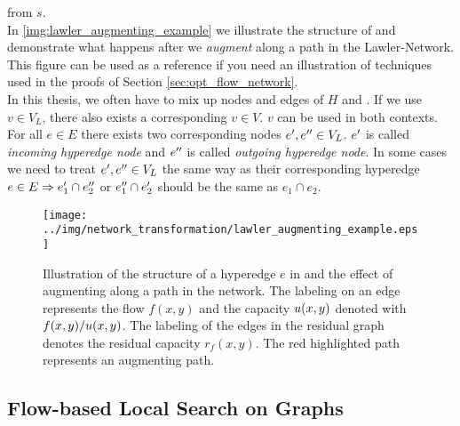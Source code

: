 from $s$. \\ 
In \autoref{img:lawler_augmenting_example} we illustrate the structure of  and demonstrate
what happens after we \emph{augment} along a path in the Lawler-Network. This figure can be used as
a reference if you need an illustration of techniques used in the proofs of Section \ref{sec:opt_flow_network}.\\
In this thesis, we often have to mix up nodes and edges of $H$ and . If we use
$v \in V_L$, there also exists a corresponding $v \in V$. $v$ can be used in both contexts.
For all $e \in E$ there exists two corresponding nodes $e',e'' \in V_L$. $e'$ 
is called \emph{incoming hyperedge node} and $e''$ is called \emph{outgoing hyperedge node}. 
In some cases we need to treat $e',e'' \in V_L$ the same way as their corresponding 
hyperedge $e \in E \Rightarrow e_1' \cap e_2''$ or $e_1'' \cap e_2'$ should be the same as $e_1 \cap e_2$.
\begin{figure}[t!]
\centering
\texttt{[image: ../img/network\_transformation/lawler\_augmenting\_example.eps]}
\caption{Illustration of the structure of a hyperedge $e$ in  and the effect of augmenting
         along a path in the network. The labeling on an edge represents the flow $f(x,y)$ and
         the capacity $u(x,y)$ denoted with $f(x,y)/u(x,y)$. The labeling of the
         edges in the residual graph denotes the residual capacity $r_f(x,y)$. The red highlighted
         path represents an augmenting path.}
\label{img:lawler_augmenting_example} 
\end{figure}


\subsection{Flow-based Local Search on Graphs}
\label{sec:flow_local_search_graph}

